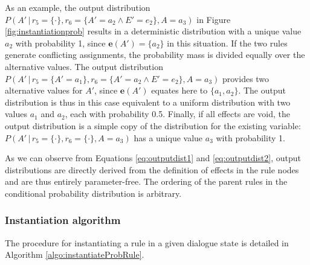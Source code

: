 As an example, the output distribution $P(A' \, | \, r_5\!=\!\{\cdot\},r_6\!=\!\{A'\!=\!a_2 \land E'\!=\!e_2\}, A\!=\!a_3)$ in Figure \ref{fig:instantiationprob} results in a deterministic distribution with a unique value $a_2$ with probability 1, since $\mathbf{e}(A') = \{a_2\}$ in this situation. If the two rules generate conflicting assignments, the probability mass is divided equally over the alternative values.   The output distribution $P(A' \, | \, r_5\!=\!\{A'\!=\!a_1\},r_6\!=\!\{A'\!=\!a_2 \land E'\!=\!e_2\}, A\!=\!a_3)$ provides two alternative values for $A'$, since $\mathbf{e}(A')$ equates here to $\{a_1,a_2\}$. The output distribution is thus in this case equivalent to a uniform distribution with two values $a_1$ and $a_2$, each with probability 0.5. Finally, if all effects are void, the output distribution is a simple copy of the distribution for the existing variable: $P(A' \, | \, r_5\!=\!\{\cdot\},r_6\!=\!\{\cdot\}, A\!=\!a_3)$ has a unique value $a_3$ with probability 1. 

As we can observe from Equations \eqref{eq:outputdist1} and \eqref{eq:outputdist2}, output distributions are directly derived from the definition of effects in the rule nodes and are thus entirely parameter-free.  The ordering of the parent rules in the conditional probability distribution is arbitrary.



\subsubsection*{Instantiation algorithm} 
\label{sec:utilruleinstantiation}

The procedure for instantiating a rule in a given dialogue state is detailed in Algorithm \ref{algo:instantiateProbRule}. 

